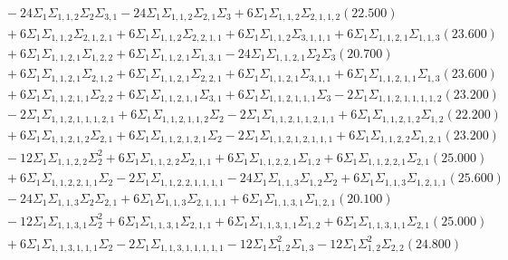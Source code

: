 \documentclass[12pt]{article}
\begin{document}
\begin{landscape}
\begin{align*}
		&\quad\quad -24\Sigma_{1}\Sigma_{1,1,2}\Sigma_{2}\Sigma_{3,1}-24\Sigma_{1}\Sigma_{1,1,2}\Sigma_{2,1}\Sigma_{3}+6\Sigma_{1}\Sigma_{1,1,2}\Sigma_{2,1,1,2}(22.500) \\ 
		&\quad\quad +6\Sigma_{1}\Sigma_{1,1,2}\Sigma_{2,1,2,1}+6\Sigma_{1}\Sigma_{1,1,2}\Sigma_{2,2,1,1}+6\Sigma_{1}\Sigma_{1,1,2}\Sigma_{3,1,1,1}+6\Sigma_{1}\Sigma_{1,1,2,1}\Sigma_{1,1,3}(23.600) \\ 
		&\quad\quad +6\Sigma_{1}\Sigma_{1,1,2,1}\Sigma_{1,2,2}+6\Sigma_{1}\Sigma_{1,1,2,1}\Sigma_{1,3,1}-24\Sigma_{1}\Sigma_{1,1,2,1}\Sigma_{2}\Sigma_{3}(20.700) \\ 
		&\quad\quad +6\Sigma_{1}\Sigma_{1,1,2,1}\Sigma_{2,1,2}+6\Sigma_{1}\Sigma_{1,1,2,1}\Sigma_{2,2,1}+6\Sigma_{1}\Sigma_{1,1,2,1}\Sigma_{3,1,1}+6\Sigma_{1}\Sigma_{1,1,2,1,1}\Sigma_{1,3}(23.600) \\ 
		&\quad\quad +6\Sigma_{1}\Sigma_{1,1,2,1,1}\Sigma_{2,2}+6\Sigma_{1}\Sigma_{1,1,2,1,1}\Sigma_{3,1}+6\Sigma_{1}\Sigma_{1,1,2,1,1,1}\Sigma_{3}-2\Sigma_{1}\Sigma_{1,1,2,1,1,1,1,2}(23.200) \\ 
		&\quad\quad -2\Sigma_{1}\Sigma_{1,1,2,1,1,1,2,1}+6\Sigma_{1}\Sigma_{1,1,2,1,1,2}\Sigma_{2}-2\Sigma_{1}\Sigma_{1,1,2,1,1,2,1,1}+6\Sigma_{1}\Sigma_{1,1,2,1,2}\Sigma_{1,2}(22.200) \\ 
		&\quad\quad +6\Sigma_{1}\Sigma_{1,1,2,1,2}\Sigma_{2,1}+6\Sigma_{1}\Sigma_{1,1,2,1,2,1}\Sigma_{2}-2\Sigma_{1}\Sigma_{1,1,2,1,2,1,1,1}+6\Sigma_{1}\Sigma_{1,1,2,2}\Sigma_{1,2,1}(23.200) \\ 
		&\quad\quad -12\Sigma_{1}\Sigma_{1,1,2,2}\Sigma_{2}^{2}+6\Sigma_{1}\Sigma_{1,1,2,2}\Sigma_{2,1,1}+6\Sigma_{1}\Sigma_{1,1,2,2,1}\Sigma_{1,2}+6\Sigma_{1}\Sigma_{1,1,2,2,1}\Sigma_{2,1}(25.000) \\ 
		&\quad\quad +6\Sigma_{1}\Sigma_{1,1,2,2,1,1}\Sigma_{2}-2\Sigma_{1}\Sigma_{1,1,2,2,1,1,1,1}-24\Sigma_{1}\Sigma_{1,1,3}\Sigma_{1,2}\Sigma_{2}+6\Sigma_{1}\Sigma_{1,1,3}\Sigma_{1,2,1,1}(25.600) \\ 
		&\quad\quad -24\Sigma_{1}\Sigma_{1,1,3}\Sigma_{2}\Sigma_{2,1}+6\Sigma_{1}\Sigma_{1,1,3}\Sigma_{2,1,1,1}+6\Sigma_{1}\Sigma_{1,1,3,1}\Sigma_{1,2,1}(20.100) \\ 
		&\quad\quad -12\Sigma_{1}\Sigma_{1,1,3,1}\Sigma_{2}^{2}+6\Sigma_{1}\Sigma_{1,1,3,1}\Sigma_{2,1,1}+6\Sigma_{1}\Sigma_{1,1,3,1,1}\Sigma_{1,2}+6\Sigma_{1}\Sigma_{1,1,3,1,1}\Sigma_{2,1}(25.000) \\ 
		&\quad\quad +6\Sigma_{1}\Sigma_{1,1,3,1,1,1}\Sigma_{2}-2\Sigma_{1}\Sigma_{1,1,3,1,1,1,1,1}-12\Sigma_{1}\Sigma_{1,2}^{2}\Sigma_{1,3}-12\Sigma_{1}\Sigma_{1,2}^{2}\Sigma_{2,2}(24.800) \\ 

\end{align*}
\end{landscape}
\end{document}
